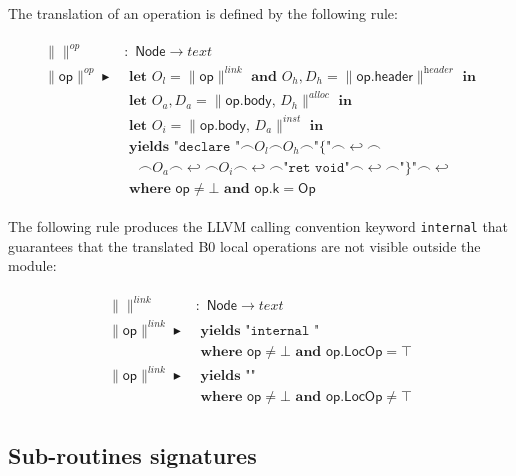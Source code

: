 \documentclass{article}
\newcommand{\trad}[2]{\ensuremath{\lVert \textsf{#1} \rVert^{\textit{#2}}}}
\newcommand{\nl}[0]{\ensuremath{\hookleftarrow}}
\DeclareMathOperator{\conc}{\smallfrown}
\DeclareMathOperator{\isdef}{\blacktriangleright}
\begin{document}
The translation of an operation is defined by the following rule:
\begin{framed}
\begin{align}
\begin{split}
  \trad{}{op} &: \textsf{ Node} \rightarrow text \\
  \trad{op}{op} \isdef
  & \textbf{ let } O_l = \trad{op}{link} \textbf{ and } O_h, D_h = \trad{op.header}{header} \textbf{ in}  \\
  & \textbf{ let } O_a, D_a = \trad{op.body, $D_h$}{alloc} \textbf{ in}  \\
  & \textbf{ let } O_i = \trad{op.body, $D_a$}{inst} \textbf{ in}  \\
  & \textbf{ yields } \texttt{"declare "} \conc O_l \conc O_h \conc \texttt{"\{"} \conc \nl \conc \\
  & \quad \conc O_a \conc \nl \conc O_i \conc \nl \conc \texttt{"ret void"} \conc \nl \conc \texttt{"\}"} \conc \nl  \\
  & \textbf{ where } \textsf{op} \ne \bot \textbf{ and } \textsf{op.k} = \textsf{Op} 
\end{split}
\end{align}
\end{framed}

The following rule produces the LLVM calling convention keyword
\texttt{internal} that guarantees that the translated B0 local
operations are not visible outside the module:
\begin{framed}
\begin{align}
\begin{split}
  \trad{}{link} &: \textsf{ Node} \rightarrow text \\
  \trad{op}{link} \isdef
  & \textbf{ yields } \texttt{"internal "} \\
  & \textbf{ where } \textsf{op} \ne \bot \textbf{ and } \textsf{op.LocOp} = \top \\
  \trad{op}{link} \isdef
  & \textbf{ yields } \texttt{""} \\
  & \textbf{ where } \textsf{op} \ne \bot \textbf{ and } \textsf{op.LocOp} \ne \top
\end{split}
\end{align}
\end{framed}

\subsection{Sub-routines signatures}
\label{sec:trad-header}
\end{document}
